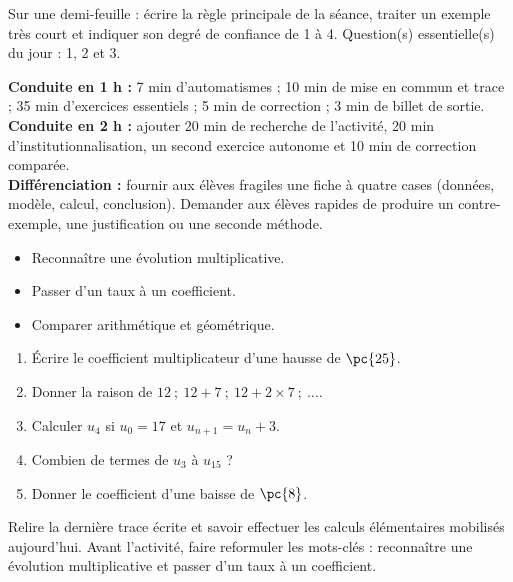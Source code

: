 \begin{exitticket}[3 minutes]Sur une demi-feuille : écrire la règle principale de la séance, traiter un exemple très court et indiquer son degré de confiance de 1 à 4. Question(s) essentielle(s) du jour : 1, 2 et 3.\end{exitticket}

\ifmxteacher
\begin{method}
\textbf{Conduite en 1 h :} 7 min d'automatismes ; 10 min de mise en commun et trace ; 35 min d'exercices essentiels ; 5 min de correction ; 3 min de billet de sortie.\\
\textbf{Conduite en 2 h :} ajouter 20 min de recherche de l'activité, 20 min d'institutionnalisation, un second exercice autonome et 10 min de correction comparée.\\
\textbf{Différenciation :} fournir aux élèves fragiles une fiche à quatre cases (données, modèle, calcul, conclusion). Demander aux élèves rapides de produire un contre-exemple, une justification ou une seconde méthode.
\end{method}
\fi
{}
    \begin{objectives}\begin{itemize}\item Reconnaître une évolution multiplicative.\item Passer d'un taux à un coefficient.\item Comparer arithmétique et géométrique.\end{itemize}\end{objectives}
    \begin{fluency}\begin{enumerate}\item Écrire le coefficient multiplicateur d'une hausse de $\pc{25}$. \item Donner la raison de $12\ ;\ 12+7\ ;\ 12+2\times7\ ;\ \ldots$. \item Calculer $u_4$ si $u_0=17$ et $u_{n+1}=u_n+3$. \item Combien de termes de $u_3$ à $u_{15}$ ? \item Donner le coefficient d'une baisse de $\pc{8}$. \end{enumerate}\end{fluency}
    \begin{prerequisites}Relire la dernière trace écrite et savoir effectuer les calculs élémentaires mobilisés aujourd'hui. Avant l'activité, faire reformuler les mots-clés : reconnaître une évolution multiplicative et passer d'un taux à un coefficient.\end{prerequisites}

